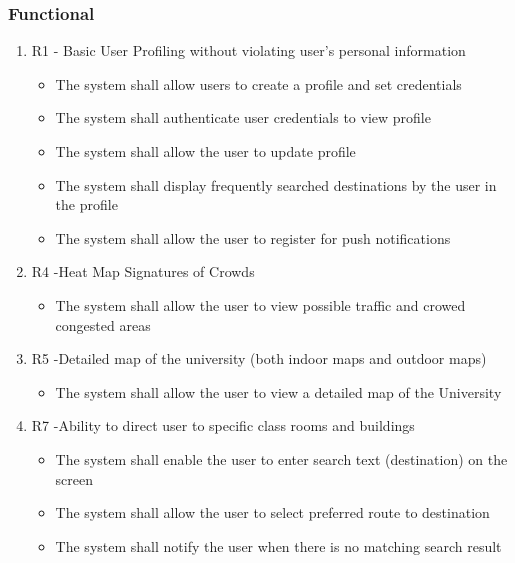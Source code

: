 \documentclass[a4paper, 12pt, one column, aas_macros]{article}
\begin{document}
\subsubsection{Functional}
\begin{enumerate}
\item R1 - Basic User Profiling without violating user’s personal information

\begin{itemize}
\item The system shall allow users to create a profile and set credentials
\item The system shall authenticate user credentials to view profile
\item The system shall allow the user to update profile
\item The system shall display frequently searched destinations by the user in the profile
\item The system shall allow the user to register for push notifications
\end{itemize}

\item R4 -Heat Map Signatures of Crowds

\begin{itemize}
\item The system shall allow the user to view possible traffic and crowed congested areas
\end{itemize}
 

\item R5 -Detailed map of the university (both indoor maps and outdoor maps)

\begin{itemize}
\item The system shall allow the user to view a detailed map of the University
\end{itemize}

\item R7 -Ability to direct user to specific class rooms and buildings

\begin{itemize}
\item The system shall enable the user to enter search text (destination) on the screen
\item The system shall allow the user to select preferred route to destination
\item The system shall notify the user when there is no matching search result
\end{itemize}


\end{enumerate}
\end{document}
